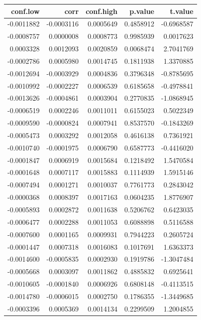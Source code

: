 \documentclass[]{tufte-handout}
\begin{document}
\begin{longtable}[]{@{}rrrrr@{}}
\toprule
conf.low & corr & conf.high & p.value & t.value \\
\midrule
\endhead
-0.0011882 & -0.0003116 & 0.0005649 & 0.4858912 & -0.6968587 \\
-0.0008757 & 0.0000008 & 0.0008773 & 0.9985939 & 0.0017623 \\
0.0003328 & 0.0012093 & 0.0020859 & 0.0068474 & 2.7041769 \\
-0.0002786 & 0.0005980 & 0.0014745 & 0.1811938 & 1.3370885 \\
-0.0012694 & -0.0003929 & 0.0004836 & 0.3796348 & -0.8785695 \\
-0.0010992 & -0.0002227 & 0.0006539 & 0.6185658 & -0.4978841 \\
-0.0013626 & -0.0004861 & 0.0003904 & 0.2770835 & -1.0868945 \\
-0.0006519 & 0.0002246 & 0.0011011 & 0.6155023 & 0.5022349 \\
-0.0009590 & -0.0000824 & 0.0007941 & 0.8537570 & -0.1843269 \\
-0.0005473 & 0.0003292 & 0.0012058 & 0.4616138 & 0.7361921 \\
-0.0010740 & -0.0001975 & 0.0006790 & 0.6587773 & -0.4416020 \\
-0.0001847 & 0.0006919 & 0.0015684 & 0.1218492 & 1.5470584 \\
-0.0001648 & 0.0007117 & 0.0015883 & 0.1114939 & 1.5915146 \\
-0.0007494 & 0.0001271 & 0.0010037 & 0.7761773 & 0.2843042 \\
-0.0000368 & 0.0008397 & 0.0017163 & 0.0604235 & 1.8776907 \\
-0.0005893 & 0.0002872 & 0.0011638 & 0.5206762 & 0.6423035 \\
-0.0006477 & 0.0002288 & 0.0011053 & 0.6088898 & 0.5116588 \\
-0.0007600 & 0.0001165 & 0.0009931 & 0.7944223 & 0.2605724 \\
-0.0001447 & 0.0007318 & 0.0016083 & 0.1017691 & 1.6363373 \\
-0.0014600 & -0.0005835 & 0.0002930 & 0.1919786 & -1.3047484 \\
-0.0005668 & 0.0003097 & 0.0011862 & 0.4885832 & 0.6925641 \\
-0.0010605 & -0.0001840 & 0.0006926 & 0.6808148 & -0.4113515 \\
-0.0014780 & -0.0006015 & 0.0002750 & 0.1786355 & -1.3449685 \\
-0.0003396 & 0.0005369 & 0.0014134 & 0.2299509 & 1.2004855 \\

\end{longtable}
\end{document}

